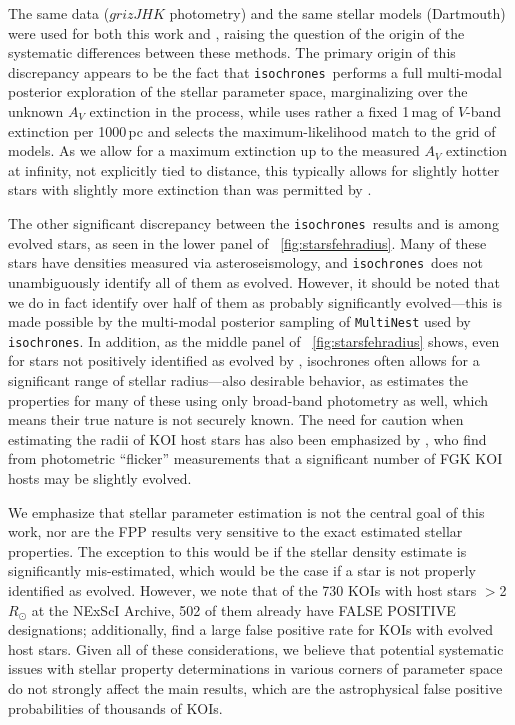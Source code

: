 \documentclass{emulateapj}
\newcommand{\figref}[1]{\ref{fig:#1}}
\newcommand{\Fig}[1]{\figurename~\figref{#1}}
\newcommand{\fig}[1]{\Fig{#1}}
\newcommand{\isochrones}{\texttt{isochrones}}
\begin{document}
The same data ($grizJHK$ photometry) and the same stellar models
(Dartmouth) were used for both this work and
, raising the question of the origin of the
systematic differences between these methods.  The primary origin of
this discrepancy appears to be the fact that \isochrones\ performs a
full multi-modal posterior exploration of the stellar parameter space,
marginalizing over the unknown $A_V$ extinction in the process, while
 uses rather a fixed 1\,mag of $V$-band
extinction per 1000\,pc and selects the maximum-likelihood
match to the grid of models.  As we allow for a maximum extinction up
to the measured $A_V$ extinction at infinity, not explicitly tied to
distance, this typically allows for slightly hotter stars with
slightly more extinction than was permitted by \citet{Dressing:2013}.

The other significant discrepancy between the \isochrones\ results and
 is among evolved stars, as seen in the lower
panel of \fig{starsfehradius}.  Many of these stars have densities
measured via asteroseismology, and \isochrones\ does not unambiguously
identify all of them as evolved.  However, it should be noted that we
do in fact identify over half of them as probably significantly
evolved---this is made possible by the multi-modal posterior sampling
of \texttt{MultiNest} used by \isochrones.  In addition, as the middle
panel of \fig{starsfehradius} shows, even for stars not positively
identified as evolved by , isochrones often
allows for a significant range of stellar radius---also desirable
behavior, as  estimates the properties for many
of these using only broad-band photometry as well, which means their
true nature is not securely known.  The need for caution when
estimating the radii of KOI host stars has also been emphasized by
, who find from photometric ``flicker''
measurements that a significant number of FGK KOI hosts may be
slightly evolved.

We emphasize that stellar parameter estimation is not the central goal
of this work, nor are the FPP results very sensitive to the exact
estimated stellar properties.  The exception to this would be if the
stellar density estimate is significantly mis-estimated, which would
be the case if a star is not properly identified as evolved.  However,
we note that of the 730 KOIs with host stars $>$2\,$R_{\odot}$ at the
NExScI Archive, 502 of them already have FALSE POSITIVE designations;
additionally, \citet{Sliski:2014} find a large false positive rate for
KOIs with evolved host stars.  Given all of these considerations, we
believe that potential systematic issues with stellar property
determinations in various corners of parameter space do not strongly
affect the main results, which are the astrophysical false positive
probabilities of thousands of KOIs.
\end{document}
